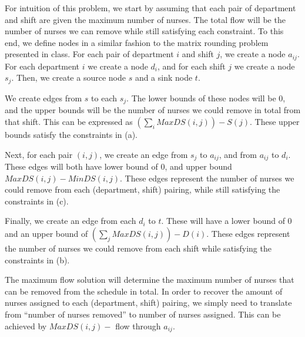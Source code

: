 \documentclass[fleqn]{homework}
\begin{document}
\begin{problem}{1}
    For intuition of this problem, we start by assuming that each pair of
    department and shift are given the maximum number of nurses.  The total flow
    will be the number of nurses we can remove while still satisfying each
    constraint.  To this end, we define nodes in a similar fashion to the matrix
    rounding problem presented in class.  For each pair of department $i$ and
    shift $j$, we create a node $a_{ij}$.  For each department $i$ we create a
    node $d_i$, and for each shift $j$ we create a node $s_j$.  Then, we create
    a source node $s$ and a sink node $t$.

    We create edges from $s$ to each $s_j$.  The lower bounds of these nodes
    will be 0, and the upper bounds will be the number of nurses we could remove
    in total from that shift.  This can be expressed as
    $\left(\sum_i MaxDS(i,j)\right) - S(j)$.  These upper bounds satisfy the
    constraints in (a).

    Next, for each pair $(i,j)$, we create an edge from $s_j$ to $a_{ij}$, and
    from $a_{ij}$ to $d_i$.  These edges will both have lower bound of 0, and
    upper bound $MaxDS(i,j) - MinDS(i,j)$.  These edges represent the number of
    nurses we could remove from each (department, shift) pairing, while still
    satisfying the constraints in (c).

    Finally, we create an edge from each $d_i$ to $t$.  These will have a lower
    bound of 0 and an upper bound of $\left(\sum_j MaxDS(i,j)\right) - D(i)$.
    These edges represent the number of nurses we could remove from each shift
    while satisfying the constraints in (b).

    The maximum flow solution will determine the maximum number of nurses that
    can be removed from the schedule in total.  In order to recover the amount
    of nurses assigned to each (department, shift) pairing, we simply need to
    translate from ``number of nurses removed'' to number of nurses assigned.
    This can be achieved by $MaxDS(i,j) -$ flow through $a_{ij}$.
  \end{problem}
\end{document}
